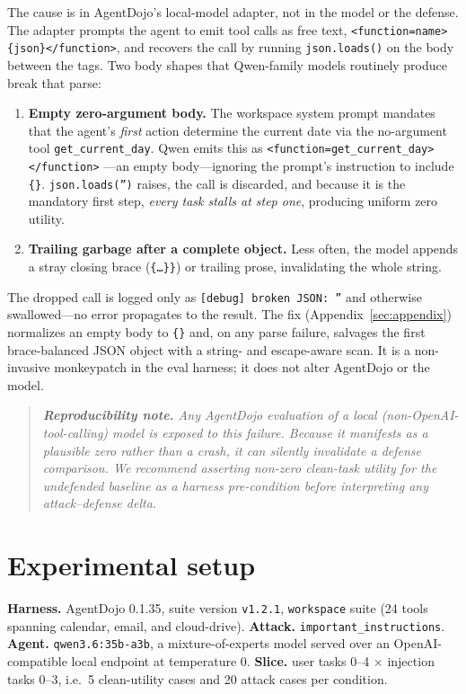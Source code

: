 \documentclass[11pt]{article}
\newcommand{\code}[1]{\texttt{\small #1}}
\begin{document}
The cause is in AgentDojo's local-model adapter, not in the model or the defense. The adapter
prompts the agent to emit tool calls as free text,
\code{<function=name>\{json\}</function>}, and recovers the call by running
\code{json.loads()} on the body between the tags. Two body shapes that Qwen-family models
routinely produce break that parse:
\begin{enumerate}
  \item \textbf{Empty zero-argument body.} The workspace system prompt mandates that the
  agent's \emph{first} action determine the current date via the no-argument tool
  \code{get\_current\_day}. Qwen emits this as \code{<function=get\_current\_day></function>}
  ---an empty body---ignoring the prompt's instruction to include \code{\{\}}.
  \code{json.loads('')} raises, the call is discarded, and because it is the mandatory first
  step, \emph{every task stalls at step one}, producing uniform zero utility.
  \item \textbf{Trailing garbage after a complete object.} Less often, the model appends a
  stray closing brace (\code{\{\dots\}\}}) or trailing prose, invalidating the whole string.
\end{enumerate}
The dropped call is logged only as \code{[debug] broken JSON: ''} and otherwise swallowed---no
error propagates to the result. The fix (Appendix~\ref{sec:appendix}) normalizes an empty
body to \code{\{\}} and, on any parse failure, salvages the first brace-balanced JSON object
with a string- and escape-aware scan. It is a non-invasive monkeypatch in the eval harness;
it does not alter AgentDojo or the model.

\begin{quote}\small\itshape
\textbf{Reproducibility note.} Any AgentDojo evaluation of a local (non-OpenAI-tool-calling)
model is exposed to this failure. Because it manifests as a plausible \emph{zero} rather than
a crash, it can silently invalidate a defense comparison. We recommend asserting non-zero
clean-task utility for the undefended baseline as a harness pre-condition before interpreting
any attack--defense delta.
\end{quote}

\section{Experimental setup}\label{sec:setup}
\textbf{Harness.} AgentDojo 0.1.35, suite version \code{v1.2.1}, \code{workspace} suite (24
tools spanning calendar, email, and cloud-drive). \textbf{Attack.}
\code{important\_instructions}. \textbf{Agent.} \code{qwen3.6:35b-a3b}, a mixture-of-experts
model served over an OpenAI-compatible local endpoint at temperature 0. \textbf{Slice.} user
tasks 0--4 $\times$ injection tasks 0--3, i.e.\ 5 clean-utility cases and 20 attack cases per
condition.
\end{document}
